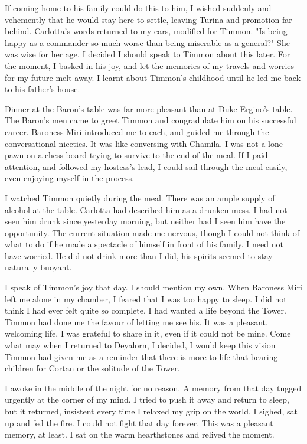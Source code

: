\documentclass{article}
\begin{document}
If coming home to his family could do this to him, I wished suddenly and vehemently that he would stay here to settle, leaving Turina and promotion far behind. Carlotta's words returned to my ears, modified for Timmon. "Is being happy as a commander so much worse than being miserable as a general?" She was wise for her age. I decided I should speak to Timmon about this later. For the moment, I basked in his joy, and let the memories of my travels and worries for my future melt away. I learnt about Timmon's childhood until he led me back to his father's house.

\vspace{.5cm}

Dinner at the Baron's table was far more pleasant than at Duke Ergino's table. The Baron's men came to greet Timmon and congradulate him on his successful career. Baroness Miri introduced me to each, and guided me through the conversational niceties. It was like conversing with Chamila. I was not a lone pawn on a chess board trying to survive to the end of the meal. If I paid attention, and followed my hostess's lead, I could sail through the meal easily, even enjoying myself in the process. 

I watched Timmon quietly during the meal. There was an ample supply of alcohol at the table. Carlotta had described him as a drunken mess. I had not seen him drunk since yesterday morning, but neither had I seen him have the opportunity. The current situation made me nervous, though I could not think of what to do if he made a spectacle of himself in front of his family. I need not have worried. He did not drink more than I did, his spirits seemed to stay naturally buoyant. 

I speak of Timmon's joy that day. I should mention my own. When Baroness Miri left me alone in my chamber, I feared that I was too happy to sleep. I did not think I had ever felt quite so complete. I had wanted a life beyond the Tower. Timmon had done me the favour of letting me see his. It was a pleasant, welcoming life, I was grateful to share in it, even if it could not be mine. Come what may when I returned to Deyalorn, I decided, I would keep this vision Timmon had given me as a reminder that there is more to life that bearing children for Cortan or the solitude of the Tower.

I awoke in the middle of the night for no reason. A memory from that day tugged urgently at the corner of my mind. I tried to push it away and return to sleep, but it returned, insistent every time I relaxed my grip on the world. I sighed, sat up and fed the fire. I could not fight that day forever. This was a pleasant memory, at least. I sat on the warm hearthstones and relived the moment. 
\end{document}
